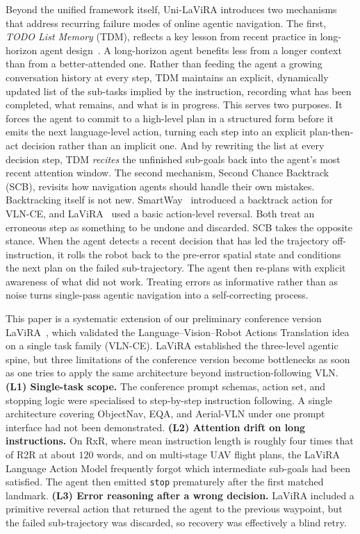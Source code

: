 \documentclass[conference]{IEEEtran}
\newcommand{\ourmethod}{Uni-LaViRA\xspace}
\begin{document}
Beyond the unified framework itself, \ourmethod introduces two mechanisms that
address recurring failure modes of online agentic navigation. The first,
\emph{TODO List Memory} (TDM), reflects a key lesson from recent practice in
long-horizon agent
design~\cite{yao2023react,shinn2023reflexion,huang2022inner}. A long-horizon
agent benefits less from a longer context than from a better-attended one.
Rather than feeding the agent a growing conversation history at every step,
TDM maintains an explicit, dynamically updated list of the sub-tasks implied
by the instruction, {recording what has been completed, what remains, and what
is in progress}. This serves two purposes. It forces the agent to commit to a
high-level plan in a structured form before it emits the next language-level
action, turning each step into an explicit plan-then-act decision rather than
an implicit one. And by rewriting the list at every decision step, TDM
\emph{recites} the unfinished sub-goals back into the agent's most recent
attention window. The second mechanism, Second Chance Backtrack (SCB),
revisits how navigation agents should handle their own mistakes. Backtracking
itself is not new. SmartWay~\cite{shi2025smartway} introduced a backtrack
action for VLN-CE, and LaViRA~\cite{ding2025lavira} used a basic action-level reversal. Both treat
an erroneous step as something to be undone and discarded. SCB takes the
opposite stance. When the agent detects a recent decision that has led the
trajectory off-instruction, it rolls the robot back to the pre-error spatial
state and conditions the next plan on the failed sub-trajectory. The agent
then re-plans with explicit awareness of what did not work. Treating errors as
informative rather than as noise turns single-pass agentic navigation into a
self-correcting process.

This paper is a systematic extension of our preliminary conference version
LaViRA~\cite{ding2025lavira}, which validated the Language--Vision--Robot
Actions Translation idea on a single task family (VLN-CE). LaViRA established
the three-level agentic spine, but three limitations of the conference version
become bottlenecks as soon as one tries to apply the same architecture beyond
instruction-following VLN. \textbf{(L1) Single-task scope.} The conference
prompt schemas, action set, and stopping logic were specialised to
step-by-step instruction following. A single architecture covering ObjectNav,
EQA, and Aerial-VLN under one prompt interface had not been demonstrated.
\textbf{(L2) Attention drift on long instructions.} On RxR, where mean
instruction length is roughly four times that of R2R at about $120$ words, and
on multi-stage UAV flight plans, the LaViRA Language Action Model frequently
forgot which intermediate sub-goals had been satisfied. The agent then emitted
\texttt{stop} prematurely after the first matched landmark. \textbf{(L3) Error
reasoning after a wrong decision.} LaViRA included a primitive reversal action
that returned the agent to the previous waypoint, but the failed
sub-trajectory was discarded, so recovery was effectively a blind retry.
\end{document}
